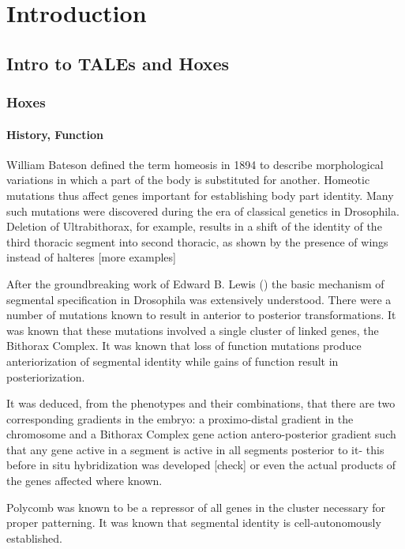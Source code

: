 \chapter{Introduction}
\label{chap:intro}

\section{Intro to TALEs and Hoxes}

\subsection{Hoxes}

\subsubsection{History, Function}
William Bateson defined the term homeosis in 1894 to describe morphological variations in which a part of the body is substituted for another. Homeotic mutations thus affect genes important for establishing body part identity. Many such mutations were discovered during the era of classical genetics in Drosophila. Deletion of Ultrabithorax, for example, results in a shift of the identity of the third thoracic segment into second thoracic, as shown by the presence of wings instead of halteres \cite{ref} [more examples]

After the groundbreaking work of Edward B. Lewis (\cite{Lewis1978}) the basic mechanism of segmental specification in Drosophila was extensively understood. There were a number of mutations known to result in anterior to posterior transformations. It was known that these mutations involved a single cluster of linked genes, the Bithorax Complex. It was known that loss of function mutations produce anteriorization of segmental identity while gains of function result in posteriorization. 

It was deduced, from the phenotypes and their combinations, that there are two corresponding gradients in the embryo: a proximo-distal gradient in the chromosome and a Bithorax Complex gene action antero-posterior gradient such that any gene active in a segment is active in all segments posterior to it- this before in situ hybridization was developed [check] or even the actual products of the genes affected where known.

Polycomb was known to be a repressor of all genes in the cluster necessary for proper patterning. It was known that segmental identity is cell-autonomously established. 

